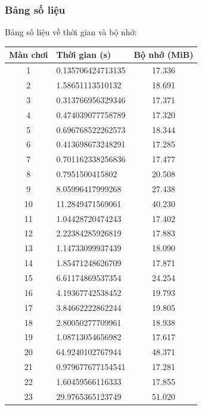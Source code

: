 \documentclass[a4paper, 11pt]{article}
\begin{document}
\subsubsection{Bảng số liệu}
Bảng số liệu về thời gian và bộ nhớ:
\begin{center}
	\begin{tabular}{|c|l|c|}
		\hline
		Màn chơi & Thời gian (s)     & Bộ nhớ (MiB) \\ \hline
		1        & 0.135706424713135 & 17.336       \\ \hline
		2        & 1.58651113510132  & 18.691       \\ \hline
		3        & 0.313766956329346 & 17.371       \\ \hline
		4        & 0.474039077758789 & 17.320       \\ \hline
		5        & 0.696768522262573 & 18.344       \\ \hline
		6        & 0.413698673248291 & 17.285       \\ \hline
		7        & 0.701162338256836 & 17.477       \\ \hline
		8        & 0.7951500415802   & 20.508       \\ \hline
		9        & 8.05996417999268  & 27.438       \\ \hline
		10       & 11.2849471569061  & 40.230       \\ \hline
		11       & 1.04428720474243  & 17.402       \\ \hline
		12       & 2.22384285926819  & 17.883       \\ \hline
		13       & 1.14733099937439  & 18.090       \\ \hline
		14       & 1.85471248626709  & 17.871       \\ \hline
		15       & 6.61174869537354  & 24.254       \\ \hline
		16       & 4.19367742538452  & 19.793       \\ \hline
		17       & 3.84662222862244  & 19.805       \\ \hline
		18       & 2.80050277709961  & 18.938       \\ \hline
		19       & 1.08713054656982  & 17.617       \\ \hline
		20       & 64.9240102767944  & 48.371       \\ \hline
		21       & 0.979677677154541 & 17.281       \\ \hline
		22       & 1.60459566116333  & 17.855       \\ \hline
		23       & 29.9765365123749  & 51.020       \\ \hline

\end{tabular}
\end{center}
\end{document}
